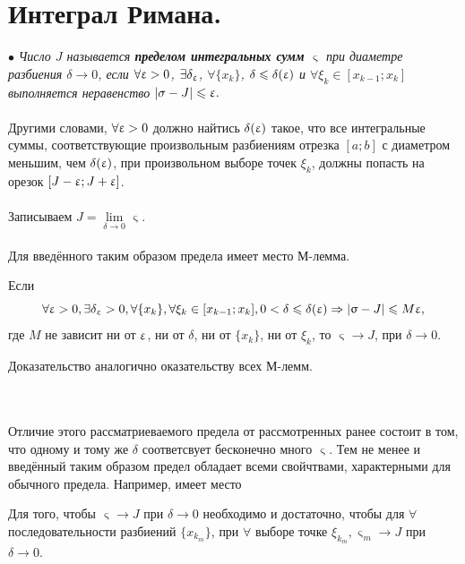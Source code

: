 \section{Интеграл Римана.}
$\bullet$ \textit{Число $J$ называется \textbf{пределом интегральных сумм} $ \upvarsigma $  при диаметре разбиения $ \delta \to 0 $, если $ \forall \upvarepsilon > 0$, $\exists \delta_{\upvarepsilon}$, $\forall \{x_k\}$, $\delta \leqslant \delta (\upvarepsilon)$ и $\forall \xi_k \in [x_{k - 1}; x_k] $ выполняется неравенство $ |\sigma - J |\leqslant \upvarepsilon.$}\\\\
Другими словами, $\forall \upvarepsilon > 0 $  должно найтись $ \delta (\upvarepsilon) $ такое, что все интегральные суммы, соответствующие произвольным разбиениям отрезка $[a; b]$  с диаметром меньшим, чем $\delta (\upvarepsilon) $, при произвольном выборе точек $\xi_k $, должны попасть на орезок $ [J - \upvarepsilon; J + \upvarepsilon]$. \\\\
Записываем $ J = \lim\limits_{\delta \rightarrow{} 0}\upvarsigma $. \\\\
Для введённого таким образом предела имеет место М-лемма. 
\begin{mlemma}
	Если $$ \forall \upvarepsilon > 0, \exists \delta_{\upvarepsilon} > 0, \forall \{x_k\}, \forall \xi_k \in [x_{k - 1}; x_k], 0 < \delta \leqslant \delta (\upvarepsilon) \Rightarrow |\upvarsigma - J| \leqslant M\upvarepsilon ,$$ где $M$ не зависит ни от $ \upvarepsilon $, ни от $ \delta $, ни от $ \{ x_k \} $, ни от $ \xi_k$, то $ \upvarsigma \rightarrow{} J $, при $ \delta \rightarrow{} 0 $.  
\end{mlemma}
\begin{Proof}
	Доказательство аналогично оказательству всех М-лемм.
\end{Proof}\\\\
Отличие этого рассматриеваемого предела от рассмотренных ранее состоит в том, что одному и тому же $ \delta $ соответсвует бесконечно много  $ \upvarsigma $. Тем не менее и введённый таким образом предел обладает всеми свойчтвами, характерными для обычного предела.
Например, имеет место
\begin{theorem}
	Для того, чтобы $ \upvarsigma \rightarrow{} J $ при $ \delta \rightarrow{} 0 $ необходимо и достаточно, чтобы для $ \forall $  последовательности разбиений $ \{ x_{k_m} \} $, при $ \forall $ выборе точке $ \xi_{k_m}, \upvarsigma_m \rightarrow{} J $  при $ \delta \rightarrow{} 0 $.
\end{theorem}
